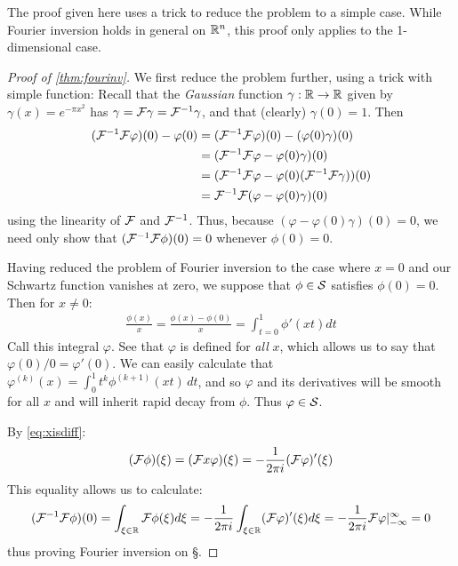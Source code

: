       \begin{rmk}
        The proof given here uses a trick to reduce the problem to a simple case.
        While Fourier inversion holds in general on $\R^n$, this proof only applies to the 1-dimensional case.
      \end{rmk}
      \begin{proof}[Proof of \cref{thm:fourinv}]
        We first reduce the problem further, using a trick with simple function:
        Recall that the \emph{Gaussian} function $\gamma:\R\rightarrow\R$ given by $\gamma(x) = e^{-\pi x^2}$ has $\gamma=\F\gamma=\F^{-1}\gamma$, and that (clearly) $\gamma(0)=1$.
        Then 
        \begin{align*}
          (\F^{-1}\F\varphi)(0) - \varphi(0) &= (\F^{-1}\F\varphi)(0) - (\varphi(0)\gamma)(0)\\
          &= (\F^{-1}\F\varphi - \varphi(0)\gamma)(0)\\
          &= (\F^{-1}\F\varphi - \varphi(0)(\F^{-1}\F\gamma))(0)\\
          &= \F^{-1}\F(\varphi-\varphi(0)\gamma)(0)
        \end{align*}
        using the linearity of $\F$ and $\F^{-1}$.
        Thus, because $(\varphi-\varphi(0)\gamma)(0)=0$, we need only show that $(\F^{-1}\F\phi)(0) = 0$ whenever $\phi(0)=0$.

        Having reduced the problem of Fourier inversion to the case where $x=0$ and our Schwartz function vanishes at zero, we suppose that $\phi\in\S$ satisfies $\phi(0)=0$. 
        Then for $x\ne0$:
        \begin{align*}
          \frac{\phi(x)}{x} = \frac{\phi(x)-\phi(0)}{x} = \int_{t=0}^1 \phi'(xt)dt
        \end{align*}
        Call this integral $\varphi$.
        See that $\varphi$ is defined for \emph{all} $x$, which allows us to say that $\varphi(0)/0=\varphi'(0)$.
        We can easily calculate that $\varphi^{(k)}(x) = \int_0^1t^k\phi^{(k+1)}(xt)\,dt$, and so $\varphi$ and its derivatives will be smooth for all $x$ and will inherit rapid decay from $\phi$.
        Thus $\varphi\in\S$.

        By \cref{eq:xisdiff}:
        \begin{align*}
          (\F\phi)(\xi) = (\F x\varphi)(\xi)= -\frac{1}{2\pi i}(\F\varphi)'(\xi)
        \end{align*}
        This equality allows us to calculate:
        \begin{align*}
          (\F^{-1}\F\phi)(0) = \int_{\xi\in\R} \F\phi(\xi)d\xi = -\frac{1}{2\pi i}\int_{\xi\in\R} (\F\varphi)'(\xi)d\xi = -\frac{1}{2\pi i} \F\varphi\vert_{-\infty}^\infty = 0
        \end{align*}
        thus proving Fourier inversion on \S.
      \end{proof}

